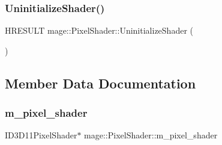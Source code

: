\subsubsection{\texorpdfstring{Uninitialize\+Shader()}{UninitializeShader()}}
{\footnotesize\ttfamily H\+R\+E\+S\+U\+LT mage\+::\+Pixel\+Shader\+::\+Uninitialize\+Shader (\begin{DoxyParamCaption}{ }\end{DoxyParamCaption})\hspace{0.3cm}{\ttfamily [protected]}}



\subsection{Member Data Documentation}
\hypertarget{classmage_1_1_pixel_shader_a07ec400ce08c37f71ce3ffa40d1bfdf6}{}\label{classmage_1_1_pixel_shader_a07ec400ce08c37f71ce3ffa40d1bfdf6} 
\subsubsection{\texorpdfstring{m\+\_\+pixel\+\_\+shader}{m\_pixel\_shader}}
{\footnotesize\ttfamily I\+D3\+D11\+Pixel\+Shader$\ast$ mage\+::\+Pixel\+Shader\+::m\+\_\+pixel\+\_\+shader\hspace{0.3cm}{\ttfamily [protected]}}

